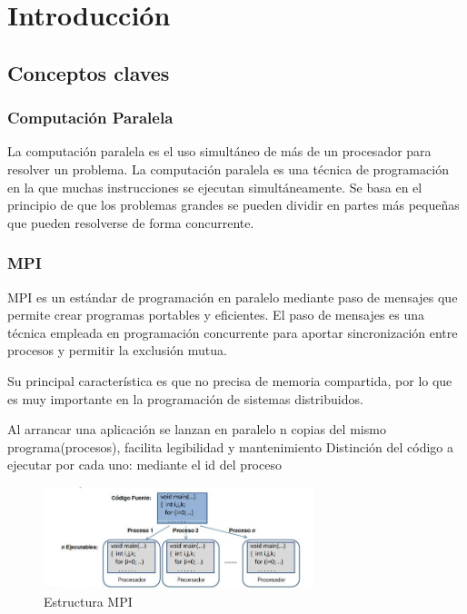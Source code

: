 \section{Introducción}
\subsection{Conceptos claves}

\subsubsection{Computación Paralela}

La computación paralela es el uso simultáneo de más de un procesador para resolver
un problema.
La computación paralela es una técnica de programación en la que muchas instrucciones se ejecutan simultáneamente. Se basa en el principio de que los problemas grandes se pueden dividir en partes más pequeñas que pueden resolverse de forma concurrente.

\subsubsection{MPI}
MPI es un estándar de programación en paralelo mediante paso
de mensajes que permite crear programas portables y eficientes.
El paso de mensajes es una técnica empleada en programación concurrente para aportar sincronización entre procesos y permitir la exclusión mutua.

Su principal característica es que no precisa de memoria compartida, por lo que es muy importante en la programación de sistemas distribuidos. 

Al arrancar una aplicación se lanzan en paralelo n copias del mismo programa(procesos), facilita legibilidad y mantenimiento Distinción del código a ejecutar por cada uno: mediante el id del proceso

\begin{figure}[H]
    \centering
  \includegraphics[width=0.7\textwidth]{images/mpi_estructure.jpg}
  \caption{Estructura MPI}
  \label{esq}
\end{figure}


